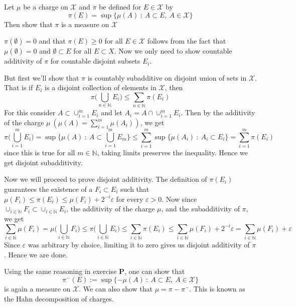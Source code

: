 \begin{exercise}[P**]
	Let $\mu$ be a charge on $\mathcal{X}$ and $\pi$ be defined for $E \in \mathcal{X}$ by $$\pi(E) = \sup \{ \mu(A) \ : \ A \subset E, \ A \in \mathcal{X} \}$$
	Then show that $\pi$ is a measure on $\mathcal{X}$
\end{exercise}
\begin{solution}
	$\pi(\emptyset) = 0$ and that $\pi(E) \ge 0$ for all $E \in \mathcal{X}$ follows from the fact that $\mu(\emptyset) = 0$ and $\emptyset \subset E$ for all $E \subset X$. Now we only need to show countable additivity of $\pi$ for countable disjoint subsets $E_i$.

	But first we'll show that $ \pi$ is countably subadditive on disjoint union of sets in $\mathcal{X}$. That is if $ E_i$ is a disjoint collection of elements in $\mathcal{X}$, then $$\pi \Big(  \bigcup_{n \in \mathbb{N}} E_i \Big) \le \sum_{n \in \mathbb{N}} \pi(E_i)$$
	For this consider $A \subset \cup_{i = 1}^{m}E_i$ and let $A_i = A \cap \cup_{i = 1}^{m}E_i$. Then by the additivity of the charge $\mu \ (\mu(A) = \sum_{i = 1}^{m} \mu(A_i))$, we get $$ \pi \Big(\bigcup_{i = 1}^{m}E_i\Big) = \sup \Big\{ \mu(A) \ : \ A \subset \bigcup_{i = 1}^{m}E_m \Big\} \le \sum_{i = 1}^{m} \sup \Big\{\mu(A_i) \ : \ A_i \subset E_i \Big\}  = \sum_{i = 1}^{m} \pi(E_i)$$
	since this is true for all $m \in \mathbb{N}$, taking limits preserves the inequality. Hence we get disjoint subadditivity.

	Now we will proceed to prove disjoint additivity. The definition of $\pi(E_i)$ guarantees the existence of a $F_i \subset E_i$ such that $\mu(F_i) \le  \pi(E_i) \le \mu(F_i) + 2^{-i}\varepsilon$ for every $\varepsilon >0$. Now since $\cup_{i \in \mathbb{N}}F_i \subset \cup_{i \in \mathbb{N}}E_i$, the additivity of the charge $\mu$, and the subadditivity of $\pi$, we get $$\sum_{i \in \mathbb{N}} \mu(F_i) = \mu \Big( \bigcup_{i \in \mathbb{N}} F_i \Big) \le \pi \Big( \bigcup_{i \in \mathbb{N}} E_i \Big) \le \sum_{i \in \mathbb{N}} \pi(E_i) \le \sum_{i \in \mathbb{N}} \mu(F_i) + 2^{-i}\varepsilon = \sum_{i \in \mathbb{N}} \mu(F_i) + \varepsilon$$
	Since $  \varepsilon$ was arbitrary by choice, limiting it to zero gives us disjoint additivity of $\pi$. Hence we are done.
\end{solution}
\begin{remark}
	\label{rem:hahn_decomposition}
	Using the same reasoning in exercise \textbf{P}, one can show that $$\pi^{-}(E) := \sup\{-\mu(A)\ :\ A \subset E,\ A \in \mathcal{X} \}$$ is again a measure on $\mathcal{X}$. We can also show that $\mu = \pi - \pi^{-}$. This is known as the Hahn decomposition of charges.
\end{remark}
